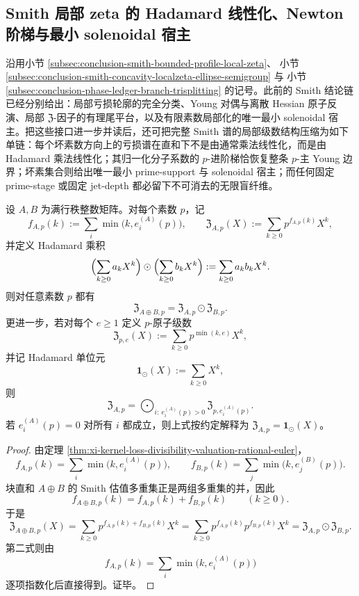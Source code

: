 \subsection{Smith 局部 zeta 的 Hadamard 线性化、Newton 阶梯与最小 solenoidal 宿主}\label{subsec:conclusion-smith-hadamard-newton-solenoid-minimality}
沿用小节 \ref{subsec:conclusion-smith-bounded-profile-local-zeta}、
小节 \ref{subsec:conclusion-smith-concavity-localzeta-ellipse-semigroup} 与
小节 \ref{subsec:conclusion-phase-ledger-branch-trisplitting} 的记号。此前的 Smith 结论链已经分别给出：局部亏损轮廓的完全分类、Young 对偶与离散 Hessian 原子反演、局部 \(\mathfrak Z\)-因子的有理尾平台，以及有限素数局部化的唯一最小 solenoidal 宿主。把这些接口进一步并读后，还可把完整 Smith 谱的局部级数结构压缩为如下单链：每个坏素数方向上的亏损谱在直和下不是由通常乘法线性化，而是由 Hadamard 乘法线性化；其归一化分子系数的 \(p\)-进阶梯恰恢复整条 \(p\)-主 Young 边界；坏素集合则给出唯一最小 prime-support 与 solenoidal 宿主；而任何固定 prime-stage 或固定 jet-depth 都必留下不可消去的无限盲纤维。

\begin{theorem}\label{thm:conclusion-smith-local-zeta-hadamard-linearization}
设 \(A,B\) 为满行秩整数矩阵。对每个素数 \(p\)，记
\[
f_{A,p}(k):=\sum_i \min\bigl(k,e_i^{(A)}(p)\bigr),
\qquad
\mathfrak Z_{A,p}(X):=\sum_{k\ge 0}p^{f_{A,p}(k)}X^k,
\]
并定义 Hadamard 乘积
\[
\Bigl(\sum_{k\ge 0}a_kX^k\Bigr)\odot
\Bigl(\sum_{k\ge 0}b_kX^k\Bigr)
:=
\sum_{k\ge 0}a_kb_kX^k.
\]
则对任意素数 \(p\) 都有
\[
\mathfrak Z_{A\oplus B,p}
=
\mathfrak Z_{A,p}\odot \mathfrak Z_{B,p}.
\]
更进一步，若对每个 \(e\ge 1\) 定义 \(p\)-原子级数
\[
\mathfrak Z_{p,e}(X):=\sum_{k\ge 0}p^{\min(k,e)}X^k,
\]
并记 Hadamard 单位元
\[
\mathbf 1_{\odot}(X):=\sum_{k\ge 0}X^k,
\]
则
\[
\mathfrak Z_{A,p}
=
\bigodot_{i:\ e_i^{(A)}(p)>0} \mathfrak Z_{p,e_i^{(A)}(p)}.
\]
若 \(e_i^{(A)}(p)=0\) 对所有 \(i\) 都成立，则上式按约定解释为 \(\mathfrak Z_{A,p}=\mathbf 1_{\odot}(X)\)。
\end{theorem}
\begin{proof}
由定理 \ref{thm:xi-kernel-loss-divisibility-valuation-rational-euler}，
\[
f_{A,p}(k)=\sum_i \min\bigl(k,e_i^{(A)}(p)\bigr),
\qquad
f_{B,p}(k)=\sum_j \min\bigl(k,e_j^{(B)}(p)\bigr).
\]
块直和 \(A\oplus B\) 的 Smith 估值多重集正是两组多重集的并，因此
\[
f_{A\oplus B,p}(k)=f_{A,p}(k)+f_{B,p}(k)
\qquad(k\ge 0).
\]
于是
\[
\mathfrak Z_{A\oplus B,p}(X)
=
\sum_{k\ge 0}p^{f_{A,p}(k)+f_{B,p}(k)}X^k
=
\sum_{k\ge 0}p^{f_{A,p}(k)}p^{f_{B,p}(k)}X^k
=
\mathfrak Z_{A,p}\odot \mathfrak Z_{B,p}.
\]
第二式则由
\[
f_{A,p}(k)=\sum_i \min\bigl(k,e_i^{(A)}(p)\bigr)
\]
逐项指数化后直接得到。证毕。
\end{proof}

